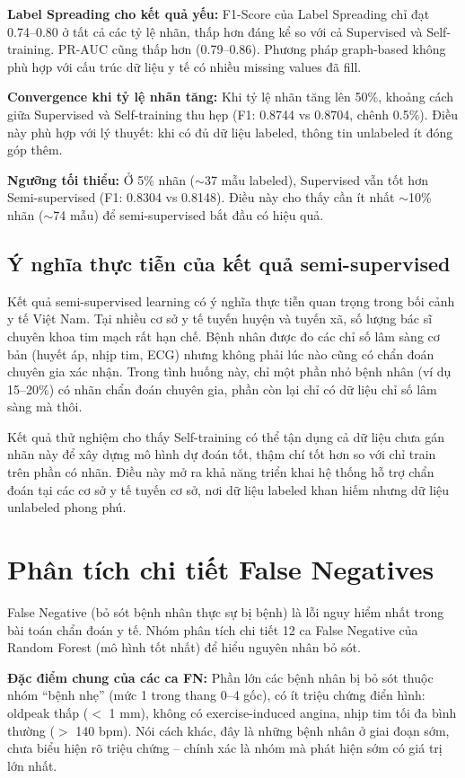 \textbf{Label Spreading cho kết quả yếu:} F1-Score của Label Spreading chỉ đạt 0.74--0.80 ở tất cả các tỷ lệ nhãn, thấp hơn đáng kể so với cả Supervised và Self-training. PR-AUC cũng thấp hơn (0.79--0.86). Phương pháp graph-based không phù hợp với cấu trúc dữ liệu y tế có nhiều missing values đã fill.

\textbf{Convergence khi tỷ lệ nhãn tăng:} Khi tỷ lệ nhãn tăng lên 50\%, khoảng cách giữa Supervised và Self-training thu hẹp (F1: 0.8744 vs 0.8704, chênh 0.5\%). Điều này phù hợp với lý thuyết: khi có đủ dữ liệu labeled, thông tin unlabeled ít đóng góp thêm.

\textbf{Ngưỡng tối thiểu:} Ở 5\% nhãn ($\sim$37 mẫu labeled), Supervised vẫn tốt hơn Semi-supervised (F1: 0.8304 vs 0.8148). Điều này cho thấy cần ít nhất $\sim$10\% nhãn ($\sim$74 mẫu) để semi-supervised bắt đầu có hiệu quả.

\subsection{Ý nghĩa thực tiễn của kết quả semi-supervised}

Kết quả semi-supervised learning có ý nghĩa thực tiễn quan trọng trong bối cảnh y tế Việt Nam. Tại nhiều cơ sở y tế tuyến huyện và tuyến xã, số lượng bác sĩ chuyên khoa tim mạch rất hạn chế. Bệnh nhân được đo các chỉ số lâm sàng cơ bản (huyết áp, nhịp tim, ECG) nhưng không phải lúc nào cũng có chẩn đoán chuyên gia xác nhận. Trong tình huống này, chỉ một phần nhỏ bệnh nhân (ví dụ 15--20\%) có nhãn chẩn đoán chuyên gia, phần còn lại chỉ có dữ liệu chỉ số lâm sàng mà thôi.

Kết quả thử nghiệm cho thấy Self-training có thể tận dụng cả dữ liệu chưa gán nhãn này để xây dựng mô hình dự đoán tốt, thậm chí tốt hơn so với chỉ train trên phần có nhãn. Điều này mở ra khả năng triển khai hệ thống hỗ trợ chẩn đoán tại các cơ sở y tế tuyến cơ sở, nơi dữ liệu labeled khan hiếm nhưng dữ liệu unlabeled phong phú.

\section{Phân tích chi tiết False Negatives}

False Negative (bỏ sót bệnh nhân thực sự bị bệnh) là lỗi nguy hiểm nhất trong bài toán chẩn đoán y tế. Nhóm phân tích chi tiết 12 ca False Negative của Random Forest (mô hình tốt nhất) để hiểu nguyên nhân bỏ sót.

\textbf{Đặc điểm chung của các ca FN:} Phần lớn các bệnh nhân bị bỏ sót thuộc nhóm ``bệnh nhẹ'' (mức 1 trong thang 0--4 gốc), có ít triệu chứng điển hình: oldpeak thấp ($<$ 1 mm), không có exercise-induced angina, nhịp tim tối đa bình thường ($>$ 140 bpm). Nói cách khác, đây là những bệnh nhân ở giai đoạn sớm, chưa biểu hiện rõ triệu chứng -- chính xác là nhóm mà phát hiện sớm có giá trị lớn nhất.

